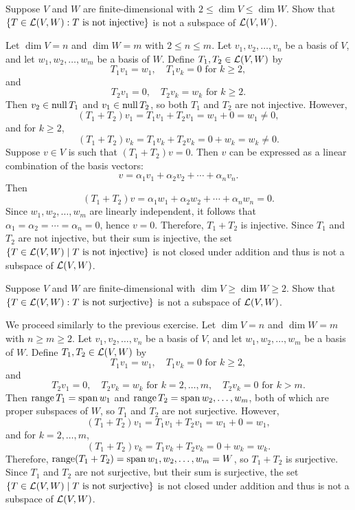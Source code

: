 \begin{exc}
\begin{exercise}
Suppose $V$ and $W$ are finite-dimensional with $2\le\dim V\le\dim W$. Show
that $\{T\in\mathcal{L}(V,W) : T \text{ is not injective}\}$ is not a subspace of
$\mathcal{L}(V,W)$.
\end{exercise}
\begin{solution}
Let $\dim V=n$ and $\dim W=m$ with $2\le n\le m$. Let $v_1,v_2,\dots,v_n$ be a
basis of $V$, and let $w_1,w_2,\dots,w_m$ be a basis of $W$. Define
$T_1,T_2\in\mathcal{L}(V,W)$ by
\[ T_1v_1=w_1, \quad T_1v_k=0 \text{ for } k\ge2, \]
and
\[ T_2v_1=0, \quad T_2v_k=w_k \text{ for } k\ge2. \]
Then $v_2\in\operatorname{null} T_1$ and $v_1\in\operatorname{null} T_2$, so both $T_1$ and $T_2$ are not
injective. However,
\[ (T_1+T_2)v_1=T_1v_1+T_2v_1=w_1+0=w_1\ne0, \]
and for $k\ge2$,
\[ (T_1+T_2)v_k=T_1v_k+T_2v_k=0+w_k=w_k\ne0. \]
Suppose $v\in V$ is such that $(T_1+T_2)v=0$. Then $v$ can be expressed as a
linear combination of the basis vectors:
\[ v=\alpha_1v_1+\alpha_2v_2+\cdots+\alpha_nv_n. \]
Then
\[ (T_1+T_2)v=\alpha_1w_1+\alpha_2w_2+\cdots+\alpha_nw_n=0. \]
Since $w_1,w_2,\dots,w_m$ are linearly independent, it follows that
$\alpha_1=\alpha_2=\cdots=\alpha_n=0$, hence $v=0$. Therefore, $T_1+T_2$ is
injective. Since $T_1$ and $T_2$ are not injective, but their sum is
injective, the set $\{T\in\mathcal{L}(V,W)\mid T \text{ is not injective}\}$ is not
closed under addition and thus is not a subspace of $\mathcal{L}(V,W)$.
\end{solution}

\begin{exercise}
Suppose $V$ and $W$ are finite-dimensional with $\dim V\ge\dim W\ge2$. Show
that $\{T\in\mathcal{L}(V,W) : T \text{ is not surjective}\}$ is not a subspace of
$\mathcal{L}(V,W)$.
\end{exercise}
\begin{solution}
We proceed similarly to the previous exercise. Let $\dim V=n$ and $\dim W=m$
with $n\ge m\ge2$. Let $v_1,v_2,\dots,v_n$ be a basis of $V$, and let
$w_1,w_2,\dots,w_m$ be a basis of $W$. Define $T_1,T_2\in\mathcal{L}(V,W)$ by
\[ T_1v_1=w_1, \quad T_1v_k=0 \text{ for } k\ge2, \]
and
\[ T_2v_1=0, \quad T_2v_k=w_k \text{ for } k=2,\dots,m, \quad
   T_2v_k=0 \text{ for } k>m. \]
Then $\operatorname{range} T_1=\operatorname{span} w_1$ and $\operatorname{range} T_2=\operatorname{span} w_2,\dots,w_m$, both of which
are proper subspaces of $W$, so $T_1$ and $T_2$ are not surjective. However,
\[ (T_1+T_2)v_1=T_1v_1+T_2v_1=w_1+0=w_1, \]
and for $k=2,\dots,m$,
\[ (T_1+T_2)v_k=T_1v_k+T_2v_k=0+w_k=w_k. \]
Therefore, $\operatorname{range}(T_1+T_2)=\operatorname{span} w_1,w_2,\dots,w_m=W$, so $T_1+T_2$ is
surjective. Since $T_1$ and $T_2$ are not surjective, but their sum is
surjective, the set $\{T\in\mathcal{L}(V,W)\mid T \text{ is not surjective}\}$ is not
closed under addition and thus is not a subspace of $\mathcal{L}(V,W)$.
\end{solution}


\end{exc}
